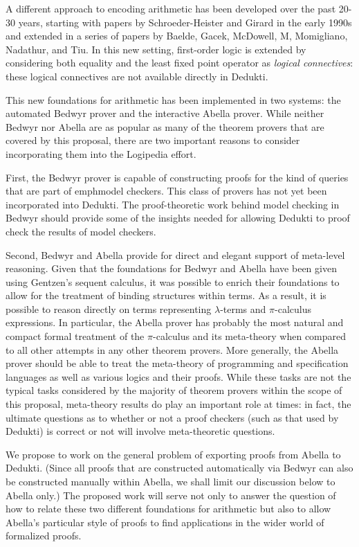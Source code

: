 \begin{workpackage}[id=theories,wphases=0-48,type=RTD,
  short=Theories in Dedukti,%
  title= Defining theories in Dedukti,
  lead=Inn,
  InnRM=10]
\begin{tasklist}
\begin{task}[id=abella,title=Express the theory of Abella in Dedukti and instrument the system]
A different approach to encoding arithmetic has been developed over
the past 20-30 years, starting with papers by Schroeder-Heister and
Girard in the early 1990s and extended in a series of papers by
Baelde, Gacek, McDowell, M, Momigliano, Nadathur, and Tiu.  In this
new setting, first-order logic is extended by considering both
equality and the least fixed point operator as \emph{logical
  connectives}: these logical connectives are not available directly
in Dedukti.

This new foundations for arithmetic has been implemented in two
systems: the automated Bedwyr prover and the interactive Abella
prover.  While neither Bedwyr nor Abella are as popular as many of the
theorem provers that are covered by this proposal, there are two
important reasons to consider incorporating them into the Logipedia
effort.

First, the Bedwyr prover is capable of constructing proofs for the
kind of queries that are part of emph{model checkers}.  This class of
provers has not yet been incorporated into Dedukti.  The
proof-theoretic work behind model checking in Bedwyr should provide
some of the insights needed for allowing Dedukti to proof check the
results of model checkers.

Second, Bedwyr and Abella provide for direct and elegant support of
meta-level reasoning.  Given that the foundations for Bedwyr and
Abella have been given using Gentzen's sequent calculus, it was
possible to enrich their foundations to allow for the treatment of
binding structures within terms.  As a result, it is possible to
reason directly on terms representing $\lambda$-terms and
$\pi$-calculus expressions.  In particular, the Abella prover has
probably the most natural and compact formal treatment of the
$\pi$-calculus and its meta-theory when compared to all other attempts
in any other theorem provers.  More generally, the Abella prover
should be able to treat the meta-theory of programming and
specification languages as well as various logics and their
proofs. While these tasks are not the typical tasks considered by the
majority of theorem provers within the scope of this proposal,
meta-theory results do play an important role at times: in fact, the
ultimate questions as to whether or not a proof checkers (such as that
used by Dedukti) is correct or not will involve meta-theoretic
questions.

We propose to work on the general problem of exporting proofs from
Abella to Dedukti.  (Since all proofs that are constructed
automatically via Bedwyr can also be constructed manually within
Abella, we shall limit our discussion below to Abella only.)  The
proposed work will serve not only to answer the question of how to
relate these two different foundations for arithmetic but also to
allow Abella's particular style of proofs to find applications in the
wider world of formalized proofs.


\end{task}
\end{tasklist}
\end{workpackage}
